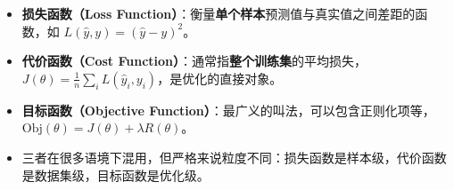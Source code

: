 \documentclass[a4paper,11pt]{ctexart}
\begin{document}
\begin{beginnerbox}
    \begin{itemize}
        \item \textbf{损失函数（Loss Function）}：衡量\textbf{单个样本}预测值与真实值之间差距的函数，如 $L(\hat{y}, y) = (\hat{y} - y)^2$。
        \item \textbf{代价函数（Cost Function）}：通常指\textbf{整个训练集}的平均损失，$J(\theta) = \frac{1}{n}\sum_i L(\hat{y}_i, y_i)$，是优化的直接对象。
        \item \textbf{目标函数（Objective Function）}：最广义的叫法，可以包含正则化项等，$\text{Obj}(\theta) = J(\theta) + \lambda R(\theta)$。
        \item 三者在很多语境下混用，但严格来说粒度不同：损失函数是样本级，代价函数是数据集级，目标函数是优化级。
    \end{itemize}
\end{beginnerbox}
\end{document}
